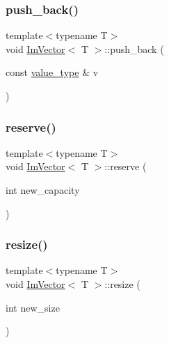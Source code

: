 \hypertarget{class_im_vector_a68387993f2a5f5c3b2a7139d9ab778b8}{}\label{class_im_vector_a68387993f2a5f5c3b2a7139d9ab778b8} 
\subsubsection{\texorpdfstring{push\+\_\+back()}{push\_back()}}
{\footnotesize\ttfamily template$<$typename T$>$ \\
void \hyperlink{class_im_vector}{Im\+Vector}$<$ T $>$\+::push\+\_\+back (\begin{DoxyParamCaption}\item[{const \hyperlink{class_im_vector_a8bd77e4e7581d8e5f9e98d7c2f3c2a80}{value\+\_\+type} \&}]{v }\end{DoxyParamCaption})}

\hypertarget{class_im_vector_a0f14f5736c3372157856eebb67123b75}{}\label{class_im_vector_a0f14f5736c3372157856eebb67123b75} 
\subsubsection{\texorpdfstring{reserve()}{reserve()}}
{\footnotesize\ttfamily template$<$typename T$>$ \\
void \hyperlink{class_im_vector}{Im\+Vector}$<$ T $>$\+::reserve (\begin{DoxyParamCaption}\item[{int}]{new\+\_\+capacity }\end{DoxyParamCaption})}

\hypertarget{class_im_vector_ac371dd62e56ae486b1a5038cf07eee56}{}\label{class_im_vector_ac371dd62e56ae486b1a5038cf07eee56} 
\subsubsection{\texorpdfstring{resize()}{resize()}\hspace{0.1cm}{\footnotesize\ttfamily [1/2]}}
{\footnotesize\ttfamily template$<$typename T$>$ \\
void \hyperlink{class_im_vector}{Im\+Vector}$<$ T $>$\+::resize (\begin{DoxyParamCaption}\item[{int}]{new\+\_\+size }\end{DoxyParamCaption})}

